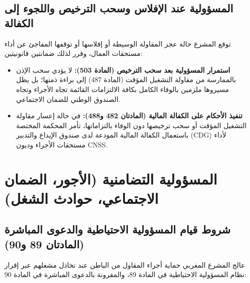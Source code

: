 \subsection{المسؤولية عند الإفلاس وسحب الترخيص واللجوء إلى الكفالة}
توقع المشرع حالة عجز المقاولة الوسيطة أو إفلاسها أو توقفها المفاجئ عن أداء مستحقات العمال، وقرر لذلك ضمانتين قانونيتين:
\begin{itemize}[leftmargin=*, itemsep=5pt]
    \item \textbf{استمرار المسؤولية بعد سحب الترخيص (المادة \textenglish{503}):} لا يؤدي سحب الإذن بالممارسة من مقاولة التشغيل المؤقت (المادة \textenglish{487}) إلى براءة ذمتها؛ بل يظل مسيروها ملزمين بالوفاء الكامل بكافة الالتزامات القائمة تجاه الأجراء وتجاه الصندوق الوطني للضمان الاجتماعي.
    \item \textbf{تنفيذ الأحكام على الكفالة المالية (المادتان \textenglish{482} و\textenglish{488}):} في حالة إعسار مقاولة التشغيل المؤقت أو سحب ترخيصها دون الوفاء بالتزاماتها، تأمر المحكمة المختصة باستعمال الكفالة المالية المودعة لدى صندوق الإيداع والتدبير (\textenglish{CDG}) لأداء مستحقات الأجراء وديون \textenglish{CNSS}.
\end{itemize}

\section{المسؤولية التضامنية (الأجور، الضمان الاجتماعي، حوادث الشغل)}

\subsection{شروط قيام المسؤولية الاحتياطية والدعوى المباشرة (المادتان 89 و90)}
عالج المشرع المغربي حماية أجراء المقاول من الباطن عند تخاذل مشغلهم عبر إقرار نظام المسؤولية الاحتياطية في المادة \textenglish{89}، والمقرونة بالدعوى المباشرة في المادة \textenglish{90}:

